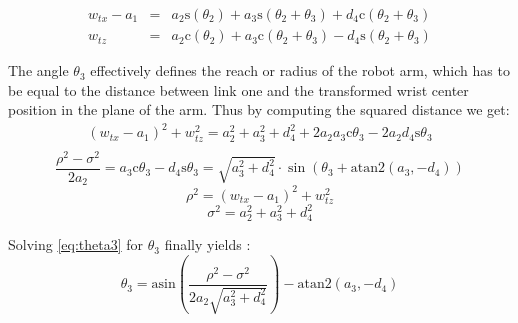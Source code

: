 \documentclass[twoside]{article}
\renewcommand{\c}{\text{c}}
\newcommand{\s}{\text{s}}
\begin{document}
\begin{eqnarray}
   w_{tx} - a_1 &=& a_2\s(\theta_2) + a_3\s(\theta_2 + \theta_3) + d_4\c(\theta_2 + \theta_3) \\
   w_{tz}       &=& a_2\c(\theta_2) + a_3\c(\theta_2 + \theta_3) - d_4\s(\theta_2 + \theta_3)
\end{eqnarray}

The angle $\theta_3$ effectively defines the reach or radius of the robot arm, which has to be equal
to the distance between link one and the transformed wrist center position in the plane of the arm.
Thus by computing the squared distance we get:
\begin{equation}
\begin{split}
(w_{tx} - a_1)^2 + w_{tz}^2
  = a_2^2 + a_3^2 + d_4^2 + 2 a_2 a_3 \c\theta_3 - 2 a_2 d_4\s\theta_3 \\
\end{split}
\end{equation}
\begin{equation}
  \frac{\rho^2 - \sigma^2}{2 a_2} = a_3\c\theta_3 - d_4\s\theta_3 = \sqrt{a_3^2 + d_4^2} \cdot \sin(\theta_3 + \text{atan2}(a_3, -d_4))
  \label{eq:theta3}
\end{equation}
\begin{equation}
  \rho^2 = (w_{tx} - a_1)^2 + w_{tz}^2
\end{equation}
\begin{equation}
  \sigma^2 = a_2^2 + a_3^2 + d_4^2
\end{equation}

\vspace{2ex}
\noindent Solving \eqref{eq:theta3} for $\theta_3$ finally yields \cite{trigonometric}:
\begin{equation}
  \theta_3 = \text{asin}\left(\frac{\rho^2 - \sigma^2}{2 a_2 \sqrt{a_3^2 + d_4^2}}\right) - \text{atan2}(a_3, -d_4)
\end{equation}
\end{document}

